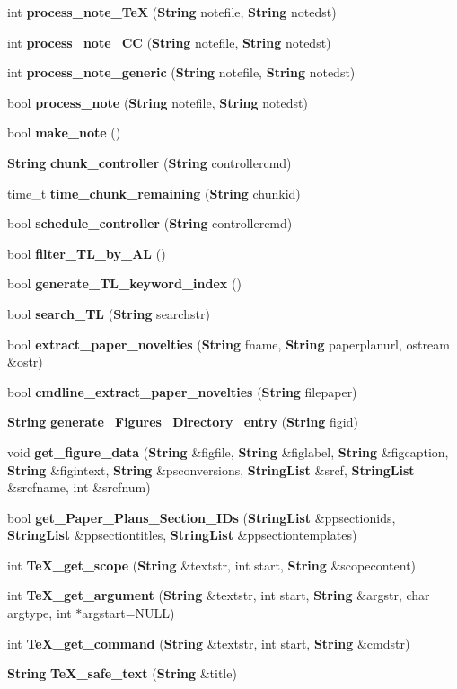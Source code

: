 \begin{CompactItemize}
int {\bf process\_\-note\_\-Te\-X} ({\bf String} notefile, {\bf String} notedst)
\item 
int {\bf process\_\-note\_\-CC} ({\bf String} notefile, {\bf String} notedst)
\item 
int {\bf process\_\-note\_\-generic} ({\bf String} notefile, {\bf String} notedst)
\item 
bool {\bf process\_\-note} ({\bf String} notefile, {\bf String} notedst)
\item 
bool {\bf make\_\-note} ()
\item 
{\bf String} {\bf chunk\_\-controller} ({\bf String} controllercmd)
\item 
time\_\-t {\bf time\_\-chunk\_\-remaining} ({\bf String} chunkid)
\item 
bool {\bf schedule\_\-controller} ({\bf String} controllercmd)
\item 
bool {\bf filter\_\-TL\_\-by\_\-AL} ()
\item 
bool {\bf generate\_\-TL\_\-keyword\_\-index} ()
\item 
bool {\bf search\_\-TL} ({\bf String} searchstr)
\item 
bool {\bf extract\_\-paper\_\-novelties} ({\bf String} fname, {\bf String} paperplanurl, ostream \&ostr)
\item 
bool {\bf cmdline\_\-extract\_\-paper\_\-novelties} ({\bf String} filepaper)
\item 
{\bf String} {\bf generate\_\-Figures\_\-Directory\_\-entry} ({\bf String} figid)
\item 
void {\bf get\_\-figure\_\-data} ({\bf String} \&figfile, {\bf String} \&figlabel, {\bf String} \&figcaption, {\bf String} \&figintext, {\bf String} \&psconversions, {\bf String\-List} \&srcf, {\bf String\-List} \&srcfname, int \&srcfnum)
\item 
bool {\bf get\_\-Paper\_\-Plans\_\-Section\_\-IDs} ({\bf String\-List} \&ppsectionids, {\bf String\-List} \&ppsectiontitles, {\bf String\-List} \&ppsectiontemplates)
\item 
int {\bf Te\-X\_\-get\_\-scope} ({\bf String} \&textstr, int start, {\bf String} \&scopecontent)
\item 
int {\bf Te\-X\_\-get\_\-argument} ({\bf String} \&textstr, int start, {\bf String} \&argstr, char argtype, int $\ast$argstart=NULL)
\item 
int {\bf Te\-X\_\-get\_\-command} ({\bf String} \&textstr, int start, {\bf String} \&cmdstr)
\item 
{\bf String} {\bf Te\-X\_\-safe\_\-text} ({\bf String} \&title)

\end{CompactItemize}
